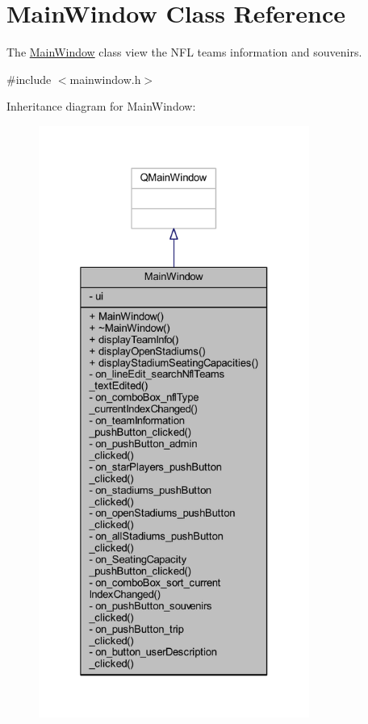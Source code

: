 \hypertarget{class_main_window}{}\section{Main\+Window Class Reference}
\label{class_main_window}


The \hyperlink{class_main_window}{Main\+Window} class view the N\+FL teams information and souvenirs.  




{\ttfamily \#include $<$mainwindow.\+h$>$}



Inheritance diagram for Main\+Window\+:
\nopagebreak
\begin{figure}[H]
\begin{center}
\leavevmode
\includegraphics[height=550pt]{class_main_window__inherit__graph}
\end{center}
\end{figure}


